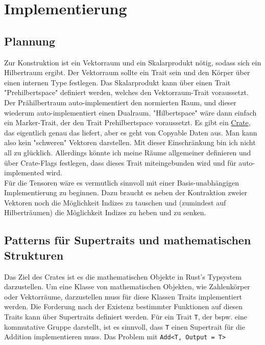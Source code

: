 \documentclass[12pt]{article}
\begin{document}
\section{Implementierung}
\subsection{Plannung}
Zur Konstruktion ist ein Vektorraum und ein Skalarprodukt nötig, sodass sich ein Hilbertraum ergibt. Der Vektorraum sollte ein Trait sein und den Körper über einen internen Type festlegen. Das Skalarprodukt kann über einen Trait "Prehilbertspace" definiert werden, welches den Vektorraum-Trait voraussetzt. Der Prähilbertraum auto-implementiert den normierten Raum, und dieser wiederum auto-implementiert einen Dualraum. "Hilbertspace" wäre dann einfach ein Marker-Trait, der den Trait Prehilbertspace voraussetzt. Es gibt ein \href{https://docs.rs/vector-space/latest/vector_space/index.html}{Crate}, das eigentlich genau das liefert, aber es geht von Copyable Daten aus. Man kann also kein "schweren" Vektoren darstellen. Mit dieser Einschränkung bin ich nicht all zu glücklich. Allerdings könnte ich meine Räume allgemeiner definieren und über Crate-Flags festlegen, dass dieses Trait miteingebunden wird und für auto-implemented wird.\\
Für die Tensoren wäre es vermutlich sinnvoll mit einer Basis-unabhängigen Implementierung zu beginnen. Dazu braucht es neben der Kontraktion zweier Vektoren noch die Möglichkeit Indizes zu tauschen und (zumindest auf Hilberträumen) die Möglichkeit Indizes zu heben und zu senken.

\subsection{Patterns für Supertraits und mathematischen Strukturen}
Das Ziel des Crates ist es die mathematischen Objekte in Rust's Typsystem darzustellen. Um eine Klasse von mathematischen Objekten, wie Zahlenkörper oder Vektorräume, darzustellen muss für diese Klassen Traits implementiert werden. Die Forderung nach der Existenz bestimmter Funktionen auf diesen Traits kann über Supertraits definiert werden. Für ein Trait \texttt T, der bspw. eine kommutative Gruppe darstellt, ist es sinnvoll, dass \texttt T einen Supertrait für die Addition implementieren muss. Das Problem mit \texttt{Add<T, Output = T>}
\end{document}
